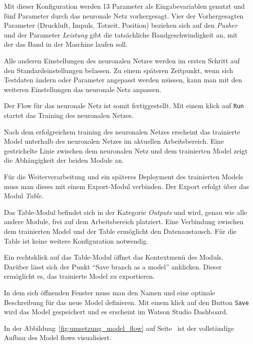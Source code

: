 Mit dieser Konfiguration werden 13 Parameter als Eingabevariablen genutzt und fünf Parameter durch das neuronale Netz
vorhergesagt. Vier der Vorhergesagten Parameter (Druckluft, Impuls, Totzeit, Position) beziehen sich auf den
\textit{Pusher} und der Parameter \textit{Leistung} gibt die tatsächliche Bandgeschwindigkeit an, mit der das Band in der
Maschine laufen soll.

Alle anderen Einstellungen des neuronalen Netzes werden im ersten Schritt auf den Standardeinstellungen belassen. Zu einem
späteren Zeitpunkt, wenn sich Testdaten ändern oder Parameter angepasst werden müssen, kann man mit den weiteren
Einstellungen das neuronale Netz anpassen.

Der Flow für das neuronale Netz ist somit fertiggestellt. Mit einem klick auf \texttt{Run} startet das Training des
neuronalen Netzes.

Nach dem erfolgreichem training des neuronalen Netzes erscheint das trainierte Model unterhalb des neuronalen Netzes im
aktuellen Arbeitsbereich. Eine gestrichelte Linie zwischen dem neuronalen Netz und dem trainierten Model zeigt die
Abhängigkeit der beiden Module an.

Für die Weiterverarbeitung und ein späteres Deployment des trainierten Models muss man dieses mit einem Export-Modul
verbinden. Der Export erfolgt über das Modul \textit{Table}.

Das Table-Modul befindet sich in der Kategorie \textit{Outputs} und wird, genau wie alle andere Module, frei auf dem
Arbeitsbereich platziert. Eine Verbindung zwischen dem trainierten Model und der Table ermöglicht den Datenaustausch.
Für die Table ist keine weitere Konfiguration notwendig.

Ein rechtsklick auf das Table-Modul öffnet das Kontextmenü des Moduls. Darüber lässt sich der Punkt
\enquote{Save branch as a model} anklicken. Dieser ermöglicht es, das trainierte Model zu exportieren.

In dem sich öffnenden Fenster muss man den Namen und eine optinale Beschreibung für das neue Model definieren. Mit einem
klick auf den Button \texttt{Save} wird das Model gespeichert und es erscheint im Watson Studio Dashboard.

In der Abbildung~\ref{fig:umsetzung_model_flow} auf Seite~\pageref{fig:umsetzung_model_flow} ist der vollständige Aufbau
des Model flows visualisiert.

